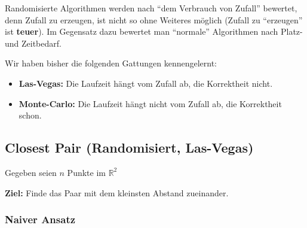 \documentclass{scrartcl}%
\begin{document}
    Randomisierte Algorithmen werden nach "`dem Verbrauch von Zufall"' bewertet,
    denn Zufall zu erzeugen, ist nicht so ohne Weiteres möglich (Zufall zu "`erzeugen"' ist \textbf{teuer}).
    Im Gegensatz dazu bewertet man "`normale"' Algorithmen nach Platz- und Zeitbedarf.

    Wir haben bisher die folgenden Gattungen kennengelernt:

    \begin{itemize}
        \item \textbf{\textsf{Las-Vegas:}} Die Laufzeit hängt vom Zufall ab, die Korrektheit nicht.
        \item \textbf{\textsf{Monte-Carlo:}} Die Laufzeit hängt nicht vom Zufall ab, die Korrektheit schon.
    \end{itemize}

    \subsection*{Closest Pair (Randomisiert, Las-Vegas)}
    \label{subsec:closestPairrandomisiert,LasVegas}

    Gegeben seien $n$ Punkte im $\mathbb{R}^2$

    \begin{figure}[htb]
        \centering


    \end{figure}

    \textbf{\textsf{Ziel:}} Finde das Paar mit dem kleinsten Abstand zueinander.

    \subsubsection*{Naiver Ansatz}
    \label{subsec:naiveransatz}
\end{document}
